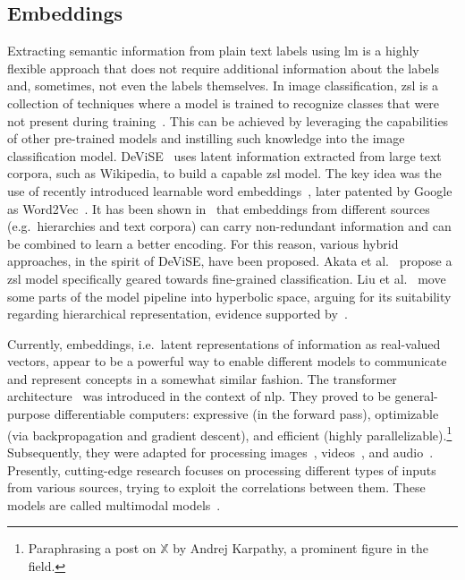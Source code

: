 \subsection{Embeddings}
\label{subsec:embeddings}

Extracting semantic information from plain text labels using \acrshort{lm} is a
highly flexible approach that does not require additional information about the
labels and, sometimes, not even the labels themselves. In image classification,
\acrfull{zsl} is a collection of techniques where a model is trained to
recognize classes that were not present during
training~\cite{AnIntroductionSoysal2020}. This can be achieved by leveraging
the capabilities of other pre-trained models and instilling such knowledge into
the image classification model. DeViSE~\cite{DeviseADeepFrome2013} uses latent
information extracted from large text corpora, such as Wikipedia, to build a
capable \acrshort{zsl} model. The key idea was the use of recently introduced
learnable word embeddings~\cite{EfficientEstimMikolo2013,
DistributedRepMikolo2013}, later patented by Google as
Word2Vec~\cite{ComputingNumerMikolo2013}. It has been shown
in~\cite{EvaluationOfOAkata2014, LabelEmbeddingAkata2015} that embeddings from
different sources (e.g.\ hierarchies and text corpora) can carry non-redundant
information and can be combined to learn a better encoding. For this reason,
various hybrid approaches, in the spirit of DeViSE, have been proposed. Akata
et al.~\cite{EvaluationOfOAkata2014} propose a \acrshort{zsl} model
specifically geared towards fine-grained classification. Liu et
al.~\cite{HyperbolicVisuLiuS2020} move some parts of the model pipeline into
hyperbolic space, arguing for its suitability regarding hierarchical
representation, evidence supported by~\cite{PoincareEmbeddNickel2017,
HyperbolicEntaGanea2018}.

Currently, embeddings, i.e.\ latent representations of information as
real-valued vectors, appear to be a powerful way to enable different models to
communicate and represent concepts in a somewhat similar fashion. The
transformer architecture~\cite{AttentionIsAlVaswan2017} was introduced in the
context of \acrfull{nlp}. They proved to be general-purpose differentiable
computers: expressive (in the forward pass), optimizable (via backpropagation
and gradient descent), and efficient (highly
parallelizable).\footnote{Paraphrasing a post on $\mathbb{X}$ by Andrej
Karpathy, a prominent figure in the field.} Subsequently, they were adapted for
processing images~\cite{ImageTransformParmar2018, EndToEndObjeCarion2020,
AnImageIsWorDosovi2020}, videos~\cite{VivitAVideoArnab2021,
TemporalContexShao2020}, and audio~\cite{NeuralSpeechSLiNa2018,
SpeechTransforDong2018, ConformerConvGulati2020}. Presently, cutting-edge
research focuses on processing different types of inputs from various sources,
trying to exploit the correlations between them. These models are called
multimodal models~\cite{ASurveyOnMulYinS2023}.

